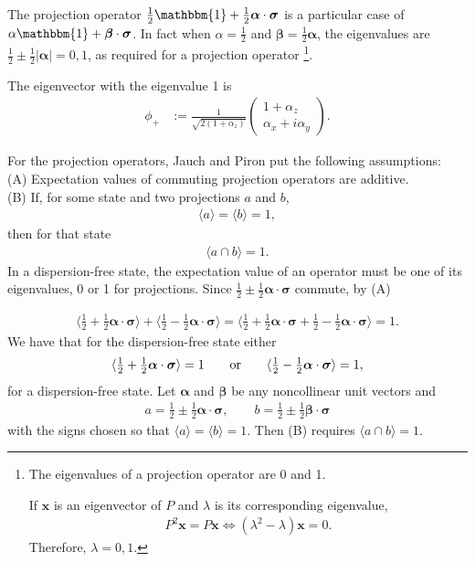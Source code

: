 \documentclass[12pt]{article}
\begin{document}
The projection operator $\tfrac{1}{2}\mathbbm{1}+\tfrac{1}{2}\bm{\alpha}\cdot\bm{\sigma}$ is a particular case of $\alpha\mathbbm{1}+\bm{\beta}\cdot\bm{\sigma}$. In fact when $\alpha=\tfrac{1}{2}$ and $\bm{\beta}=\tfrac{1}{2}\bm{\alpha}$, the eigenvalues are $\tfrac{1}{2}\pm\tfrac{1}{2}|\bm{\alpha}|=0,1$, as required for a projection operator
\footnote{
The eigenvalues of a projection operator are 0 and 1.

If $\bm{x}$ is an eigenvector of $P$ and $\lambda$ is its corresponding eigenvalue,
\begin{align*}
P^2\bm{x} = P\bm{x} \Leftrightarrow (\lambda^2-\lambda)\bm{x}=0.
\end{align*}
Therefore, $\lambda=0,1$.
}.  

The eigenvector with the eigenvalue 1 is
\begin{align*}
    \phi_{+}
    &:= \frac{1}{\sqrt{2 (1+\alpha_z)}}
    \begin{pmatrix}
      1 +\alpha_z \\
      \alpha_x+i\alpha_y
    \end{pmatrix}.
\end{align*}

For the projection operators, Jauch and Piron put the following assumptions:\\
(A) Expectation values of commuting projection operators are additive. \\
(B) If, for some state and two projections $a$ and $b$,
\begin{align*}
\langle a \rangle = \langle b \rangle = 1,
\end{align*}
then for that state 
\begin{align*}
\langle a \cap b \rangle = 1.
\end{align*}
In a dispersion-free state, the expectation value of an operator must be one of its eigenvalues, 0 or 1 for projections. Since $\tfrac{1}{2}\pm\tfrac{1}{2}\bm{\alpha}\cdot\bm{\sigma}$ commute, by (A)

\begin{align*}
\langle\tfrac{1}{2}+\tfrac{1}{2}\bm{\alpha}\cdot\bm{\sigma}\rangle+
\langle\tfrac{1}{2}-\tfrac{1}{2}\bm{\alpha}\cdot\bm{\sigma}\rangle
=\langle\tfrac{1}{2}+\tfrac{1}{2}\bm{\alpha}\cdot\bm{\sigma}+\tfrac{1}{2}-\tfrac{1}{2}\bm{\alpha}\cdot\bm{\sigma}\rangle =1.
\end{align*}
We have that for the dispersion-free state either
\begin{align*}
\langle\tfrac{1}{2}+\tfrac{1}{2}\bm{\alpha}\cdot\bm{\sigma}\rangle = 1 \qquad {\rm or} \qquad \langle\tfrac{1}{2}-\tfrac{1}{2}\bm{\alpha}\cdot\bm{\sigma}\rangle=1,
\end{align*}
for a dispersion-free state. Let $\bm{\alpha}$ and $\bm{\beta}$ be any noncollinear unit vectors and
\begin{align*}
a= \tfrac{1}{2}\pm\tfrac{1}{2}\bm{\alpha}\cdot\bm{\sigma}, \qquad b= \tfrac{1}{2}\pm\tfrac{1}{2}\bm{\beta}\cdot\bm{\sigma}
\end{align*}
with the signs chosen so that $\langle a \rangle = \langle b \rangle = 1$. Then (B) requires $\langle a \cap b \rangle = 1.$
\end{document}
